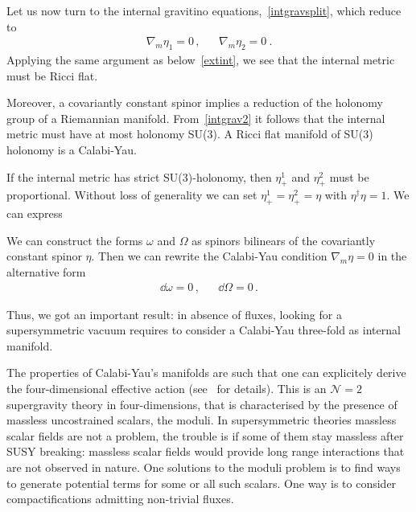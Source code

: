\documentclass[debug]{phd}
\begin{document}
Let us now turn to the internal gravitino equations,~\eqref{intgravsplit}, which reduce to
\begin{align}
\label{intgrav2}
& & \nabla_m\eta_1=0\, , & & \nabla_m\eta_2=0\ . & &
\end{align}
Applying the same argument as below~\eqref{extint}, we see that the internal metric must be Ricci flat.

Moreover, a covariantly constant spinor implies a reduction of the holonomy group of a Riemannian manifold.
From~\eqref{intgrav2} it follows that the internal metric must have at most holonomy SU(3). A Ricci flat manifold of SU(3) holonomy is a Calabi-Yau.



If the internal metric has strict SU(3)-holonomy, then $\eta^1_+$ and $\eta^2_+$ must be proportional. Without loss of generality we can set $\eta^1_+=\eta^2_+=\eta$ with $\eta^\dagger\eta=1$. We can express 

We can construct the forms $\omega$ and $\Omega$ as spinors bilinears of the covariantly constant spinor $\eta$. Then 
we can rewrite the Calabi-Yau condition $\nabla_m\eta=0$ in the alternative form
						\begin{equation}
							\begin{array}{lcr}
								\dd \omega = 0\, , & & \dd \Omega = 0 \, .
							\end{array}
						\end{equation}
				
				Thus, we got an important result: in absence of fluxes, looking for a supersymmetric vacuum requires to consider a Calabi-Yau three-fold as internal manifold.
	
The properties of Calabi-Yau's manifolds are such that one can explicitely derive the four-dimensional effective action (see~\cite{CeresoleN2, Bodner:1990zm} for details).		
			This is an $\mathcal{N} = 2$ supergravity theory in four-dimensions, that is characterised by the presence of massless uncostrained scalars, the moduli. 
			In supersymmetric theories massless scalar fields are not a problem, the trouble is if some of them stay massless after SUSY breaking: massless scalar fields would provide long range interactions that are not observed in nature. 
			One solutions to the moduli problem is to find ways to generate potential terms for some or all such scalars. 
			One way is to consider compactifications admitting non-trivial fluxes.
\end{document}
